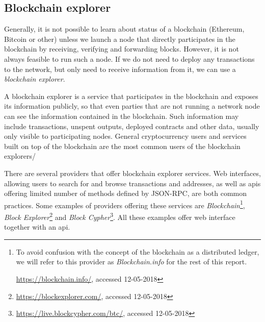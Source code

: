 \subsection{Blockchain explorer}
Generally, it is not possible to learn about status of a blockchain (Ethereum, Bitcoin or other) unless we launch a node that directly participates in the blockchain by receiving, verifying and forwarding blocks. However, it is not always feasible to run such a node. If we do not need to deploy any transactions to the network, but only need to receive information from it, we can use a \textit{blockchain explorer}.

A blockchain explorer is a service that participates in the blockchain and exposes its information publicly, so that even parties that are not running a network node can see the information contained in the blockchain\footnotemark. Such information may include transactions, unspent outputs, deployed contracts and other data, usually only visible to participating nodes. 
% 
% 
General cryptocurrency users and services built on top of the blockchain are the most common users of the blockchain explorers\footnotemark/
%

There are several providers that offer blockchain explorer services. Web interfaces, allowing users to search for and browse transactions and addresses, as well as \acrshort{api}s offering limited number of methods defined by JSON-RPC, are both common practices. Some examples of providers offering these services are \textit{Blockchain}\footnote{To avoid confusion with the concept of the blockchain as a distributed ledger, we will refer to this provider as \textit{Blockchain.info} for the rest of this report.

\url{https://blockchain.info/}, accessed 12-05-2018}, \textit{Block Explorer}\footnote{\url{https://blockexplorer.com/}, accessed 12-05-2018} and \textit{Block Cypher}\footnote{\url{https://live.blockcypher.com/btc/}, accessed 12-05-2018}. All these examples offer web interface together with an \acrshort{api}.